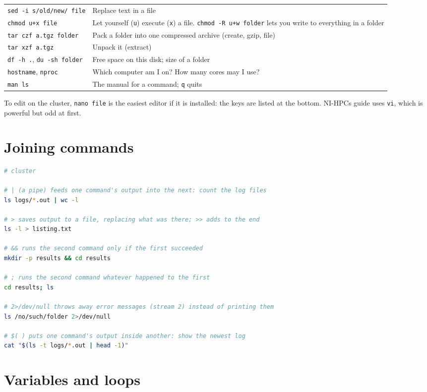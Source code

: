 {\begin{longtable}[]{@{}
  >{\raggedright\arraybackslash}p{}
  >{\raggedright\arraybackslash}p{}@{}}
\texttt{sed\ -i\ \textquotesingle{}s/old/new/\textquotesingle{}\ file} & Replace text in a file \\
\texttt{chmod\ u+x\ file} & Let yourself (\texttt{u}) execute (\texttt{x}) a file. \texttt{chmod\ -R\ u+w\ folder} lets you write to everything in a folder \\
\texttt{tar\ czf\ a.tgz\ folder} & Pack a folder into one compressed archive (create, gzip, file) \\
\texttt{tar\ xzf\ a.tgz} & Unpack it (extract) \\
\texttt{df\ -h\ .}, \texttt{du\ -sh\ folder} & Free space on this disk; size of a folder \\
\texttt{hostname}, \texttt{nproc} & Which computer am I on? How many cores may I use? \\
\texttt{man\ ls} & The manual for a command; \texttt{q} quits \\
\end{longtable}
}

To edit on the cluster, \texttt{nano\ file} is the easiest editor if it is installed: the keys are listed at the bottom. NI-HPC\textquotesingle s guide uses \texttt{vi}, which is powerful but odd at first.

\section{Joining commands}\label{joining-commands}

\begin{lstlisting}[language=bash]
# cluster

# | (a pipe) feeds one command's output into the next: count the log files
ls logs/*.out | wc -l

# > saves output to a file, replacing what was there; >> adds to the end
ls -l > listing.txt

# && runs the second command only if the first succeeded
mkdir -p results && cd results

# ; runs the second command whatever happened to the first
cd results; ls

# 2>/dev/null throws away error messages (stream 2) instead of printing them
ls /no/such/folder 2>/dev/null

# $( ) puts one command's output inside another: show the newest log
cat "$(ls -t logs/*.out | head -1)"
\end{lstlisting}

\section{Variables and loops}\label{variables-and-loops}

